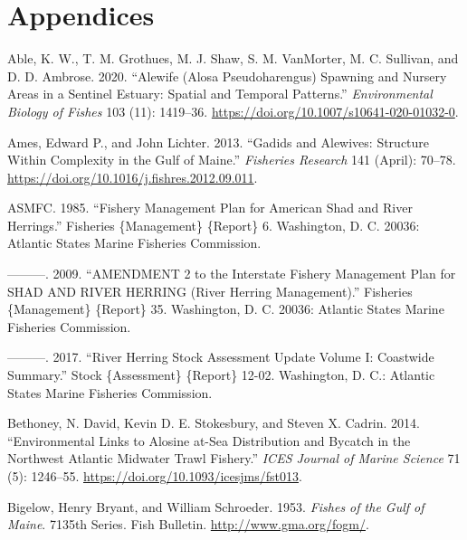\documentclass[
]{book}
\newlength{\cslhangindent}
\newlength{\cslentryspacingunit} %
\newenvironment{CSLReferences}[2] %
 {%
  \setlength{\parindent}{0pt}
  \ifodd #1
  \let\oldpar\par
  \def\par{\hangindent=\cslhangindent\oldpar}
  \fi
  \setlength{\parskip}{#2\cslentryspacingunit}
 }%
 {}
\begin{document}
\hypertarget{appendices}{%
\chapter*{Appendices}\label{appendices}}

\hypertarget{refs}{}
\begin{CSLReferences}{1}{0}
\leavevmode{}%
Able, K. W., T. M. Grothues, M. J. Shaw, S. M. VanMorter, M. C. Sullivan, and D. D. Ambrose. 2020. {``Alewife ({Alosa} Pseudoharengus) Spawning and Nursery Areas in a Sentinel Estuary: Spatial and Temporal Patterns.''} \emph{Environmental Biology of Fishes} 103 (11): 1419--36. \url{https://doi.org/10.1007/s10641-020-01032-0}.

\leavevmode{}%
Ames, Edward P., and John Lichter. 2013. {``Gadids and {Alewives}: {Structure} Within Complexity in the {Gulf} of {Maine}.''} \emph{Fisheries Research} 141 (April): 70--78. \url{https://doi.org/10.1016/j.fishres.2012.09.011}.

\leavevmode{}%
ASMFC. 1985. {``Fishery {Management} {Plan} for {American} {Shad} and {River} {Herrings}.''} Fisheries \{Management\} \{Report\} 6. Washington, D. C. 20036: Atlantic States Marine Fisheries Commission.

\leavevmode{}%
---------. 2009. {``{AMENDMENT} 2 to the {Interstate} {Fishery} {Management} {Plan} for {SHAD} {AND} {RIVER} {HERRING} ({River} {Herring} {Management}).''} Fisheries \{Management\} \{Report\} 35. Washington, D. C. 20036: Atlantic States Marine Fisheries Commission.

\leavevmode{}%
---------. 2017. {``River {Herring} {Stock} {Assessment} {Update} {Volume} {I}: {Coastwide} {Summary}.''} Stock \{Assessment\} \{Report\} 12-02. Washington, D. C.: Atlantic States Marine Fisheries Commission.

\leavevmode{}%
Bethoney, N. David, Kevin D. E. Stokesbury, and Steven X. Cadrin. 2014. {``Environmental Links to Alosine at-Sea Distribution and Bycatch in the {Northwest} {Atlantic} Midwater Trawl Fishery.''} \emph{ICES Journal of Marine Science} 71 (5): 1246--55. \url{https://doi.org/10.1093/icesjms/fst013}.

\leavevmode{}%
Bigelow, Henry Bryant, and William Schroeder. 1953. \emph{Fishes of the {Gulf} of {Maine}}. 7135th Series. Fish Bulletin. \url{http://www.gma.org/fogm/}.


\end{CSLReferences}
\end{document}
